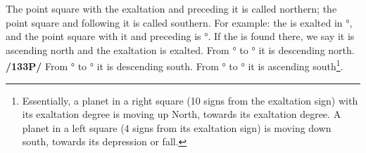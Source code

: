 The point square with the exaltation and preceding it is called northern; the point square and following it is called southern. For example: the \Sun\xspace is exalted in °, and the point square with it and preceding is °. If the \Sun\xspace is found there, we say it is ascending north and the exaltation is exalted. From \Aries\xspace 19° to \Cancer\xspace 19° it is descending north. \textbf{/133P/} From \Cancer\xspace 19° to \Libra\xspace 19° it is descending south. From \Libra\xspace 19° to \Capricorn\xspace 19° it is ascending south\footnote{Essentially, a planet in a right square (10 signs from the exaltation sign) with its exaltation degree is moving up North, towards its exaltation degree. A planet in a left square (4 signs from its exaltation sign) is moving down south, towards its depression or fall.}.

